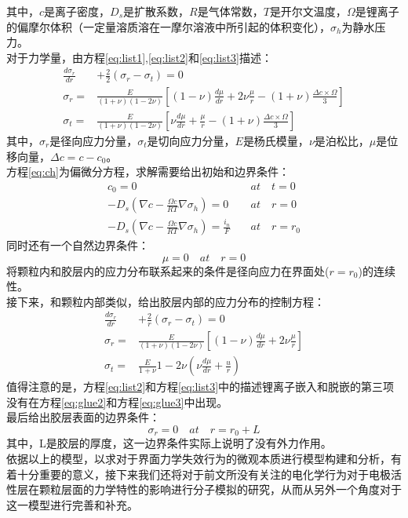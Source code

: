 其中，$c$是离子密度，$D_s$是扩散系数，$R$是气体常数，$T$是开尔文温度，$\Omega$是锂离子的偏摩尔体积（一定量溶质溶在一摩尔溶液中所引起的体积变化），$\sigma_h$为静水压力。\\
对于力学量，由方程\ref{eq:list1},\ref{eq:list2}和\ref{eq:list3}描述：\\
\begin{align}
\label{eq:list1}
\frac{d \sigma_r}{d r} &+\frac{2}{2}(\sigma_r - \sigma_t)  = 0\\
\label{eq:list2}
\sigma_r =& \frac{E}{(1+\nu)(1-2\nu)} \left[(1-\nu)\frac{d \mu}{d r} +2\nu \frac{\mu}{r} - (1+\nu)\frac{\Delta c \times \Omega}{3} \right] \\
\label{eq:list3}
\sigma_t =& \frac{E}{(1+\nu)(1-2\nu)} \left[\nu\frac{d \mu}{d r} + \frac{\mu}{r} - (1+\nu)\frac{\Delta c \times \Omega}{3} \right]
\end{align}
其中，$\sigma_r$是径向应力分量，$\sigma_t$是切向应力分量，$E$是杨氏模量，$\nu$是泊松比，$\mu$是位移向量，$\Delta c = c-c_0$。\\
方程\ref{eq:ch}为偏微分方程，求解需要给出初始和边界条件：
\begin{align}
c_0=0 \quad & at \quad t=0\\
-D_s\left(\nabla c - \frac{\Omega c}{RT} \nabla \sigma_h \right) = 0 \quad & at \quad r=0\\
-D_s\left(\nabla c - \frac{\Omega c}{RT} \nabla \sigma_h \right) = \frac{i_n}{F} \quad & at \quad r=r_0
\end{align}
同时还有一个自然边界条件：
\begin{equation}
\mu = 0 \quad at \quad r=0
\end{equation}
将颗粒内和胶层内的应力分布联系起来的条件是径向应力在界面处($r=r_0$)的连续性。\\
\indent 接下来，和颗粒内部类似，给出胶层内部的应力分布的控制方程：
\begin{align}
\label{eq:glue1}
\frac{d \sigma_r}{d r} &+ \frac{2}{r}(\sigma_r - \sigma_t) = 0\\
\label{eq:glue2}
\sigma_r =& \frac{E}{(1+\nu)(1-2\nu)}\left[(1-\nu)\frac{d \mu}{d r} + 2\nu \frac{\mu}{r} \right]\\
\label{eq:glue3}
\sigma_t =& \frac{E}{1+\nu}{1-2\nu}\left( \nu\frac{d \mu}{d r}+\frac{u}{r} \right)
\end{align}
值得注意的是，方程\ref{eq:list2}和方程\ref{eq:list3}中的描述锂离子嵌入和脱嵌的第三项没有在方程\ref{eq:glue2}和方程\ref{eq:glue3}中出现。\\
最后给出胶层表面的边界条件：
\begin{equation}
\sigma_r = 0 \quad at \quad r = r_0 + L 
\end{equation}
其中，L是胶层的厚度，这一边界条件实际上说明了没有外力作用。\\
\indent 
依据以上的模型，以求对于界面力学失效行为的微观本质进行模型构建和分析，有着十分重要的意义，接下来我们还将对于前文所没有关注的电化学行为对于电极活性层在颗粒层面的力学特性的影响进行分子模拟的研究，从而从另外一个角度对于这一模型进行完善和补充。
